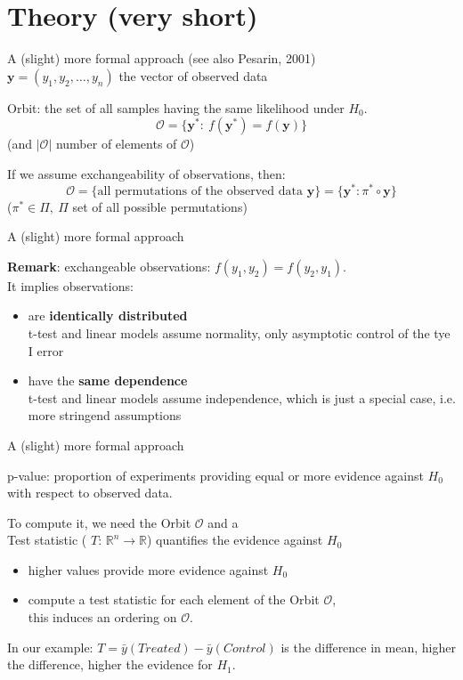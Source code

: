 \documentclass[xcolor={pdftex,dvipsnames,table}]{beamer}
\newcommand{\rbf}[1]{\textcolor{redUnipd}{ #1}}
\newcommand{\bi}{\begin {itemize}}
\newcommand{\ei}{\end{itemize}}
\newcommand{\yy}{\mathbf{y}}
\newcommand{\Orbit}{\mathcal{O}}
\begin{document}
\section{Theory (very short)}
\begin{frame}{A (slight) more formal approach}
(see also Pesarin, 2001)\\
$\yy=(y_1,y_2,\ldots,y_n)$ the vector of observed data

\medskip
\rbf{Orbit}: the set of all samples having the same likelihood under $H_0$.\\
$$\Orbit=\{\yy^*:\ f(\yy^*)=f(\yy) \}$$
(and $|\Orbit|$ number of elements of $\Orbit$)

\medskip

If we assume exchangeability of observations, then:
$$\Orbit=\{\textrm{all permutations of the observed data }\yy\} = \{\yy^*:\pi^*\circ\yy\}$$
($\pi^*\in \Pi,\ \Pi$ set of all possible permutations)

\end{frame}
\begin{frame}{A (slight) more formal approach}

{\bf Remark}: exchangeable observations: $f(y_1,y_2)=f(y_2,y_1)$. \\ It implies observations:
\bi
\item are {\bf identically distributed}\\ t-test and linear models assume normality, only asymptotic control of the tye I error
\item have the {\bf same dependence}\\ 
t-test and linear models assume independence, which is just a special case, i.e. more stringend assumptions 
\ei

\end{frame}
\begin{frame}{A (slight) more formal approach}

\rbf{p-value}: proportion of experiments providing equal or more evidence against $H_0$ with respect to observed data.

\medskip
To compute it, we need the \rbf{Orbit $\Orbit$} and a \pause \\
\rbf{Test statistic} (\rbf{$T$}:  $\mathbb{R}^n\to\mathbb{R}$) quantifies the evidence against $H_0$
\bi
\item higher values provide more evidence against $H_0$
\item compute a test statistic for each element of the Orbit $\Orbit$, \\ this induces an ordering on $\Orbit$.
\ei
In our example: $T=\bar{y}(Treated)-\bar{y}(Control)$ is the difference in mean, higher the difference, higher the evidence for $H_1$. 
\end{frame}
\end{document}
